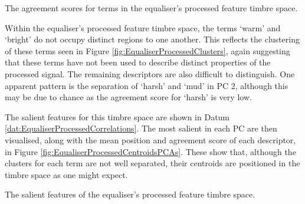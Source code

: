 			\begin{table}[h!]
				\centering
				
				\caption{The agreement scores for terms in the 
					 equaliser's processed feature timbre space.}
				\label{tab:EqualiserProcessedAgreements}
			\end{table}

			Within the equaliser's processed feature timbre space, the terms `warm' and `bright' do not occupy
			distinct regions to one another. This reflects the clustering of these terms seen in Figure
			\ref{fig:EqualiserProcessedClusters}, again suggesting that these terms have not been used to
			describe distinct properties of the processed signal. The remaining descriptors are also difficult
			to distinguish. One apparent pattern is the separation of `harsh' and `mud' in PC 2, although this
			may be due to chance as the agreement score for `harsh' is very low.

			The salient features for this timbre space are shown in Datum
			\ref{dat:EqualiserProcessedCorrelations}. The most salient in each PC are then visualised, along
			with the mean position and agreement score of each descriptor, in Figure
			\ref{fig:EqualiserProcessedCentroidsPCAs}. These show that, although the clusters for each term are
			not well separated, their centroids are positioned in the timbre space as one might expect.

			\begin{datum}[h!]
				\centering
				\begin{minipage}{0.9\textwidth}
					
				\end{minipage}
				\caption{The salient features of the equaliser's
					 processed feature timbre space.}
				\label{dat:EqualiserProcessedCorrelations}
			\end{datum}

